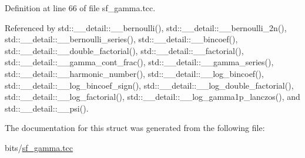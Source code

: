 Definition at line 66 of file sf\+\_\+gamma.\+tcc.



Referenced by std\+::\+\_\+\+\_\+detail\+::\+\_\+\+\_\+bernoulli(), std\+::\+\_\+\+\_\+detail\+::\+\_\+\+\_\+bernoulli\+\_\+2n(), std\+::\+\_\+\+\_\+detail\+::\+\_\+\+\_\+bernoulli\+\_\+series(), std\+::\+\_\+\+\_\+detail\+::\+\_\+\+\_\+bincoef(), std\+::\+\_\+\+\_\+detail\+::\+\_\+\+\_\+double\+\_\+factorial(), std\+::\+\_\+\+\_\+detail\+::\+\_\+\+\_\+factorial(), std\+::\+\_\+\+\_\+detail\+::\+\_\+\+\_\+gamma\+\_\+cont\+\_\+frac(), std\+::\+\_\+\+\_\+detail\+::\+\_\+\+\_\+gamma\+\_\+series(), std\+::\+\_\+\+\_\+detail\+::\+\_\+\+\_\+harmonic\+\_\+number(), std\+::\+\_\+\+\_\+detail\+::\+\_\+\+\_\+log\+\_\+bincoef(), std\+::\+\_\+\+\_\+detail\+::\+\_\+\+\_\+log\+\_\+bincoef\+\_\+sign(), std\+::\+\_\+\+\_\+detail\+::\+\_\+\+\_\+log\+\_\+double\+\_\+factorial(), std\+::\+\_\+\+\_\+detail\+::\+\_\+\+\_\+log\+\_\+factorial(), std\+::\+\_\+\+\_\+detail\+::\+\_\+\+\_\+log\+\_\+gamma1p\+\_\+lanczos(), and std\+::\+\_\+\+\_\+detail\+::\+\_\+\+\_\+psi().



The documentation for this struct was generated from the following file\+:\begin{DoxyCompactItemize}
\item 
bits/\hyperlink{sf__gamma_8tcc}{sf\+\_\+gamma.\+tcc}\end{DoxyCompactItemize}
